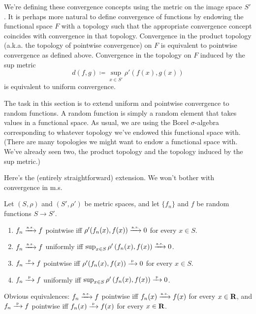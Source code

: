 \documentclass[11pt,letterpaper,reqno,oneside]{article}
\begin{document}
We're defining these convergence concepts using the metric on the image space $S'$. It is perhaps more natural to define convergence of functions by endowing the functional space $F$ with a topology such that the appropriate convergence concept coincides with convergence in that topology. Convergence in the product topology (a.k.a. the topology of pointwise convergence) on $F$ is equivalent to pointwise convergence as defined above. Convergence in the topology on $F$ induced by the sup metric
%
\begin{equation*}
	d(f,g) \coloneqq \sup_{x \in S'} \rho'(f(x),g(x))
\end{equation*}
%
is equivalent to uniform convergence.


The task in this section is to extend uniform and pointwise convergence to random functions. A random function is simply a random element that takes values in a functional space. As usual, we are using the Borel $\sigma$-algebra corresponding to whatever topology we've endowed this functional space with. (There are many topologies we might want to endow a functional space with. We've already seen two, the product topology and the topology induced by the sup metric.)

Here's the (entirely straightforward) extension. We won't bother with convergence in m.s.
%
\begin{definition}
	Let $(S,\rho)$ and $(S',\rho')$ be metric spaces, and let $\{ f_n \}$ and $f$ be random functions $S \to S'$.
	\begin{enumerate}

		\item $f_n \xrightarrow{{\scriptscriptstyle \mathrm{a.s.}}} f$ pointwise iff $\rho'(f_n(x),f(x)) \xrightarrow{{\scriptscriptstyle \mathrm{a.s.}}} 0$ for every $x \in S$.

		\item $f_n \xrightarrow{{\scriptscriptstyle \mathrm{a.s.}}} f$ uniformly iff $\sup_{x \in S} \rho'\left( f_n(x), f(x) \right) \xrightarrow{{\scriptscriptstyle \mathrm{a.s.}}} 0$.

		\item $f_n \xrightarrow{{\scriptscriptstyle \mathrm{\;p\;}}} f$ pointwise iff $\rho'(f_n(x),f(x)) \xrightarrow{{\scriptscriptstyle \mathrm{\;p\;}}} 0$ for every $x \in S$.

		\item $f_n \xrightarrow{{\scriptscriptstyle \mathrm{\;p\;}}} f$ uniformly iff $\sup_{x \in S} \rho'\left( f_n(x), f(x) \right) \xrightarrow{{\scriptscriptstyle \mathrm{\;p\;}}} 0$.

	\end{enumerate}
\end{definition}

\begin{remark}
	Obvious equivalences: $f_n \xrightarrow{{\scriptscriptstyle \mathrm{a.s.}}} f$ pointwise iff $f_n(x) \xrightarrow{{\scriptscriptstyle \mathrm{a.s.}}} f(x)$ for every $x \in \mathbf{R}$, and $f_n \xrightarrow{{\scriptscriptstyle \mathrm{\;p\;}}} f$ pointwise iff $f_n(x) \xrightarrow{{\scriptscriptstyle \mathrm{\;p\;}}} f(x)$ for every $x \in \mathbf{R}$.
\end{remark}
\end{document}

